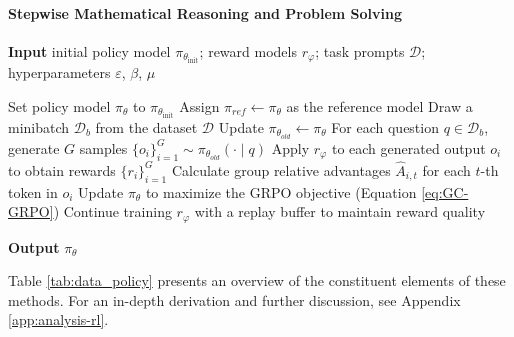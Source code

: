 \paragraph{Stepwise Mathematical Reasoning and Problem Solving}

\begin{algorithm}[t]
  \small
  \caption{Iterative Group Relative Policy Optimization}
  \textbf{Input} initial policy model $\pi_{\theta_{\text{init}}}$; reward models $r_\varphi$; task prompts $\mathcal{D}$; 
  hyperparameters $\varepsilon$, $\beta$, $\mu$
  \begin{algorithmic}[1]
    \State Set policy model $\pi_\theta$ to $\pi_{\theta_{\text{init}}}$
       \State Assign $\pi_{ref} \gets \pi_{\theta}$ as the reference model
      \State Draw a minibatch $\mathcal{D}_b$ from the dataset $\mathcal{D}$
      \State Update $\pi_{\theta_{old}} \gets \pi_{\theta}$
      \State For each question $q \in \mathcal{D}_b$, generate $G$ samples $\{o_i\}_{i=1}^G \sim \pi_{\theta_{old}}(\cdot \mid q)$
      \State Apply $r_\varphi$ to each generated output $o_i$ to obtain rewards $\{r_i\}_{i=1}^{G}$
      \State Calculate group relative advantages $\hat{A}_{i,t}$ for each $t$-th token in $o_i$
        \State Update $\pi_\theta$ to maximize the GRPO objective (Equation \ref{eq:GC-GRPO})
      \EndFor
    \EndFor
    \State Continue training $r_\varphi$ with a replay buffer to maintain reward quality
    \EndFor
  \end{algorithmic}
  \textbf{Output} $\pi_\theta$
  \label{alg:iter-grpo}
\end{algorithm}

Table \ref{tab:data_policy} presents an overview of the constituent elements of these methods. For an in-depth derivation and further discussion, see Appendix \ref{app:analysis-rl}.

